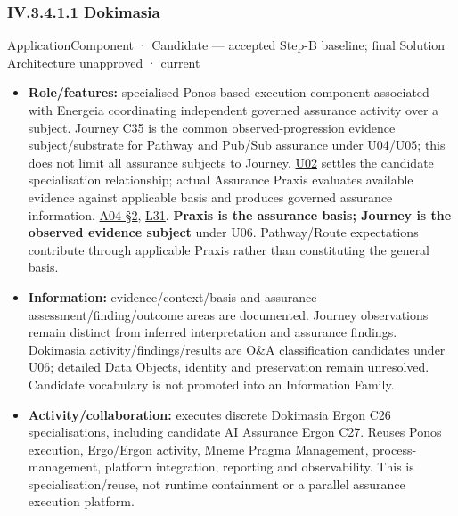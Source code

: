 \subsubsection*{IV.3.4.1.1 Dokimasia}
\label{navigation:IV.3.4.1.1}

\label{element:d739c75dffe2453081735710b285f03b}
{\small ApplicationComponent · Candidate — accepted Step-B baseline; final Solution Architecture unapproved · current}\par

\begin{itemize}


\item \textbf{Role/features:} specialised Ponos-based execution component associated with Energeia
  coordinating independent governed assurance activity over a subject. Journey
  C35 is the common observed-progression evidence subject/substrate for Pathway
  and Pub/Sub
  assurance under U04/U05; this does not limit all assurance subjects to Journey.
  \href{\detokenize{../../../../../docs/markdown/05-information-systems-architecture/sources.md#u02}}{U02} settles the candidate specialisation relationship; actual
  Assurance Praxis evaluates available
  evidence against applicable basis and produces governed assurance information.
  \href{\detokenize{../../../../../docs/markdown/05-information-systems-architecture/sources.md#a04}}{A04 §2}, \href{\detokenize{../../../../../docs/markdown/05-information-systems-architecture/sources.md#l31}}{L31}. \textbf{Praxis is the assurance basis;
  Journey is the observed evidence subject} under U06. Pathway/Route expectations
  contribute through applicable Praxis rather than constituting the general basis.

\item \textbf{Information:} evidence/context/basis and assurance assessment/finding/outcome
  areas are documented. Journey observations remain distinct from inferred
  interpretation and assurance findings. Dokimasia activity/findings/results are
  O\&A classification candidates under U06; detailed Data Objects, identity and
  preservation remain unresolved. Candidate vocabulary is not promoted into an
  Information Family.

\item \textbf{Activity/collaboration:} executes discrete Dokimasia Ergon C26 specialisations,
  including candidate AI Assurance Ergon C27. Reuses Ponos execution, Ergo/Ergon
  activity, Mneme Pragma Management, process-management, platform integration,
  reporting and observability. This is specialisation/reuse, not runtime containment
  or a parallel assurance execution platform.


\end{itemize}
